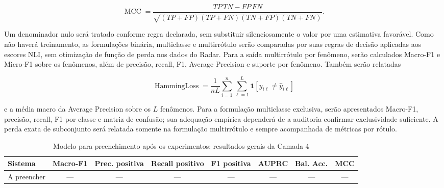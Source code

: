 \[
\operatorname{MCC}=
\frac{TP\,TN-FP\,FN}
{\sqrt{(TP+FP)(TP+FN)(TN+FP)(TN+FN)}}.
\]

Um denominador nulo será tratado conforme regra declarada, sem substituir silenciosamente o valor por uma estimativa favorável. Como não haverá treinamento, as formulações binária, multiclasse e multirrótulo serão comparadas por suas regras de decisão aplicadas aos escores NLI, sem otimização de função de perda nos dados do Radar. Para a saída multirrótulo por fenômeno, serão calculados Macro-F1 e Micro-F1 sobre os fenômenos, além de precisão, recall, F1, Average Precision e suporte por fenômeno. Também serão relatadas

\[
\operatorname{HammingLoss}=\frac{1}{nL}\sum_{i=1}^{n}\sum_{\ell=1}^{L}
\mathbf{1}[y_{i\ell}\neq\widehat y_{i\ell}]
\]

e a média macro da Average Precision sobre os \(L\) fenômenos. Para a formulação multiclasse exclusiva, serão apresentados Macro-F1, precisão, recall, F1 por classe e matriz de confusão; sua adequação empírica dependerá de a auditoria confirmar exclusividade suficiente. A perda exata de subconjunto será relatada somente na formulação multirrótulo e sempre acompanhada de métricas por rótulo.

\begin{table}[htbp]
\centering
\caption{Modelo para preenchimento após os experimentos: resultados gerais da Camada 4}
\label{tab:resultados-gerais-c4}
\scriptsize
\begin{tabular}{|l|c|c|c|c|c|c|c|}
\hline
\textbf{Sistema} & \textbf{Macro-F1} & \textbf{Prec. positiva} & \textbf{Recall positivo} & \textbf{F1 positiva} & \textbf{AUPRC} & \textbf{Bal. Acc.} & \textbf{MCC} \\
\hline
A preencher & --- & --- & --- & --- & --- & --- & --- \\
\hline
\end{tabular}
\end{table}

